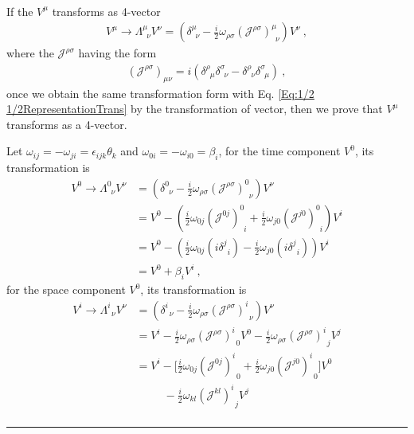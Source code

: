 \documentclass[12pt]{report}
\numberwithin{problemname}{chapter}
\newenvironment{solution}{\vspace{1em}\par\noindent{\large\textbf{\textsc{Solution}}}\par}{\vspace{1em}\hrule}
\begin{document}
\begin{solution}
\begin{enumerate}[(a)]
\begin{align}
    \end{align}
    If the $V^{\mu}$ transforms as 4-vector
    \begin{align}
        V^{\mu}\rightarrow\Lambda^{\mu}_{\enspace\nu}V^{\nu}=(\delta^{\mu}_{\enspace\nu}-\frac{i}{2}\omega_{\rho\sigma}(\mathcal{J}^{\rho\sigma})^{\mu}_{\enspace\nu})V^{\nu}\ ,
    \end{align}
    where the $\mathcal{J}^{\rho\sigma}$ having the form
    \begin{align}
        (\mathcal{J}^{\rho\sigma})_{\mu\nu}=i(\delta^{\rho}_{\enspace\mu}\delta^{\sigma}_{\enspace\nu}-\delta^{\rho}_{\enspace\nu}\delta^{\sigma}_{\enspace\mu})\ ,
    \end{align}
    once we obtain the same transformation form with Eq. \eqref{Eq:1/2 1/2RepresentationTrans} by the transformation of vector, then we prove that $V^{\mu}$ transforms as a 4-vector.\par
    Let $\omega_{ij}=-\omega_{ji}=\epsilon_{ijk}\theta_{k}$ and $\omega_{0i}=-\omega_{i0}=\beta_i$, for the time component $V^0$, its transformation is
    \begin{align}
        V^0\to \Lambda^0_{\enspace\nu}V^{\nu}&=(\delta^{0}_{\enspace\nu}-\frac{i}{2}\omega_{\rho\sigma}(\mathcal{J}^{\rho\sigma})^{0}_{\enspace\nu})V^{\nu} \nonumber \\
        &=V^0-(\frac{i}{2}\omega_{0j}(\mathcal{J}^{0j})^{0}_{\enspace i}+\frac{i}{2}\omega_{j0}(\mathcal{J}^{j0})^{0}_{\enspace i})V^{i} \nonumber \\
        &=V^0-(\frac{i}{2}\omega_{0j}(i\delta^j_{\enspace i})-\frac{i}{2}\omega_{j0}(i\delta^j_{\enspace i}))V^{i} \nonumber \\
        &=V^0+\beta_iV^i \ ,
    \end{align}
    for the space component $V^0$, its transformation is
    \begin{align}
        V^i\to \Lambda^i_{\enspace\nu}V^{\nu}&=(\delta^{i}_{\enspace\nu}-\frac{i}{2}\omega_{\rho\sigma}(\mathcal{J}^{\rho\sigma})^{i}_{\enspace\nu})V^{\nu} \nonumber \\
        &=V^i-\frac{i}{2}\omega_{\rho\sigma}(\mathcal{J}^{\rho\sigma})^{i}_{\enspace 0}V^{0}-\frac{i}{2}\omega_{\rho\sigma}(\mathcal{J}^{\rho\sigma})^{i}_{\enspace j}V^{j} \nonumber \\
        &=V^i-\bigg[\frac{i}{2}\omega_{0j}(\mathcal{J}^{0j})^{i}_{\enspace 0}+\frac{i}{2}\omega_{j0}(\mathcal{J}^{j0})^{i}_{\enspace 0}\bigg]V^{0} \nonumber \\
        &\quad\quad\enspace -\frac{i}{2}\omega_{kl}(\mathcal{J}^{kl})^{i}_{\enspace j}V^{j} \nonumber \\

\end{align}
\end{enumerate}
\end{solution}
\end{document}

